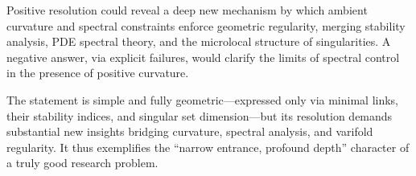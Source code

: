 Positive resolution could reveal a deep new mechanism by which ambient curvature and spectral constraints enforce geometric regularity, merging stability analysis, PDE spectral theory, and the microlocal structure of singularities.  
A negative answer, via explicit failures, would clarify the limits of spectral control in the presence of positive curvature.  

The statement is simple and fully geometric—expressed only via minimal links, their stability indices, and singular set dimension—but its resolution demands substantial new insights bridging curvature, spectral analysis, and varifold regularity. It thus exemplifies the “narrow entrance, profound depth” character of a truly good research problem.